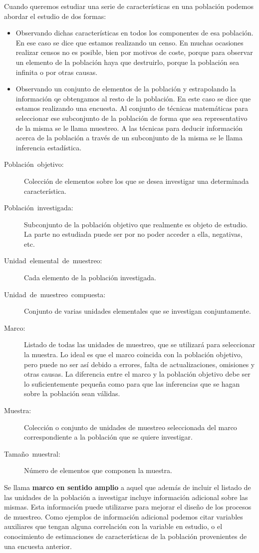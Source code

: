 Cuando queremos estudiar una serie de caracter\'isticas en una poblaci\'on
podemos abordar el estudio de dos formas:
\begin{itemize}
\item Observando dichas caracter\'isticas en todos los componentes de esa
poblaci\'on. En ese caso se dice que estamos realizando un censo. En
muchas ocasiones realizar censos no es posible, bien por motivos de
coste, porque para observar un elemento de la poblaci\'on haya que destruirlo,
porque la poblaci\'on sea infinita o por otras causas.
\item Observando un conjunto de elementos de la poblaci\'on y estrapolando
la informaci\'on qe obtengamos al resto de la poblaci\'on. En este caso
se dice que estamos realizando una encuesta. Al conjunto de t\'ecnicas
matem\'aticas para seleccionar ese subconjunto de la poblaci\'on de forma
que sea representativo de la misma se le llama muestreo. A las t\'ecnicas
para deducir informaci\'on acerca de la poblaci\'on a trav\'es de un subconjunto
de la misma se le llama inferencia estad\'istica.\end{itemize}
\begin{description}
\item [{Poblaci\'on~objetivo:}] Colecci\'on de elementos sobre los que se
desea investigar una determinada caracter\'istica.
\item [{Poblaci\'on~investigada:}] Subconjunto de la poblaci\'on objetivo
que realmente es objeto de estudio. La parte no estudiada puede ser
por no poder acceder a ella, negativas, etc.
\item [{Unidad~elemental~de~muestreo:}] Cada elemento de la poblaci\'on
investigada.
\item [{Unidad~de~muestreo~compuesta:}] Conjunto de varias unidades
elementales que se investigan conjuntamente.
\item [{Marco:}] Listado de todas las unidades de muestreo, que se utilizar\'a
para seleccionar la muestra. Lo ideal es que el marco coincida con
la poblaci\'on objetivo, pero puede no ser as\'i debido a errores, falta
de actualizaciones, omisiones y otras causas. La diferencia entre
el marco y la poblaci\'on objetivo debe ser lo suficientemente peque\~na
como para que las inferencias que se hagan sobre la poblaci\'on sean
v\'alidas.
\item [{Muestra:}] Colecci\'on o conjunto de unidades de muestreo seleccionada
del marco correspondiente a la poblaci\'on que se quiere investigar.
\item [{Tama\~no~muestral:}] N\'umero de elementos que componen la muestra.
\end{description}
Se llama \textbf{marco en sentido amplio} a aquel que adem\'as de incluir
el listado de las unidades de la poblaci\'on a investigar incluye informaci\'on
adicional sobre las mismas. Esta informaci\'on puede utilizarse para
mejorar el dise\~no de los procesos de muestreo. Como ejemplos de informaci\'on
adicional podemos citar variables auxiliares que tengan alguna correlaci\'on
con la variable en estudio, o el conocimiento de estimaciones de caracter\'isticas
de la poblaci\'on provenientes de una encuesta anterior.

